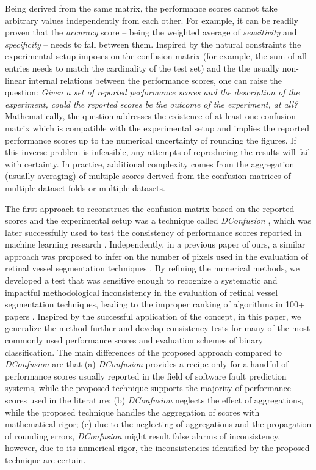 \documentclass[5p, final]{elsarticle}
\begin{document}
Being derived from the same matrix, the performance scores cannot take arbitrary values independently from each other. For example, it can be readily proven that the \emph{accuracy} score -- being the weighted average of \emph{sensitivity} and \emph{specificity} -- needs to fall between them. 
Inspired by the natural constraints the experimental setup imposes on the confusion matrix (for example, the sum of all entries needs to match the cardinality of the test set) and the the usually non-linear internal relations between the performance scores, one can raise the question: \emph{Given a set of reported performance scores and the description of the experiment, could the reported scores be the outcome of the experiment, at all?} Mathematically, the question addresses the existence of at least one confusion matrix which is compatible with the experimental setup and implies the reported performance scores up to the numerical uncertainty of rounding the figures. If this inverse problem is infeasible, any attempts of reproducing the results will fail with certainty. In practice, additional complexity comes from the aggregation (usually averaging) of multiple scores derived from the confusion matrices of multiple dataset folds or multiple datasets.

The first approach to reconstruct the confusion matrix based on the reported scores and the experimental setup was a technique called \emph{DConfusion} \cite{dconfusion}, which was later successfully used to test the consistency of performance scores reported in machine learning research \cite{errorsml}.
Independently, in a previous paper of ours, a similar approach was proposed to infer on the number of pixels used in the evaluation of retinal vessel segmentation techniques \cite{vesselsegm}. 
By refining the numerical methods, we developed a test that was sensitive enough to recognize a systematic and impactful methodological inconsistency in the evaluation of retinal vessel segmentation techniques, leading to the improper ranking of algorithms in 100+ papers \cite{vessel}. 
Inspired by the successful application of the concept, in this paper, we generalize the method further and develop consistency tests for many of the most commonly used performance scores and evaluation schemes of binary classification. The main differences of the proposed approach compared to \emph{DConfusion} \cite{dconfusion} are that (a) \emph{DConfusion} provides a recipe only for a handful of performance scores usually reported in the field of software fault prediction systems, while the proposed technique supports the majority of performance scores used in the literature; (b) \emph{DConfusion} neglects the effect of aggregations, while the proposed technique handles the aggregation of scores with mathematical rigor; (c) due to the neglecting of aggregations and the propagation of rounding errors, \emph{DConfusion} might result false alarms of inconsistency, however, due to its numerical rigor, the inconsistencies identified by the proposed technique are certain. 
\end{document}
